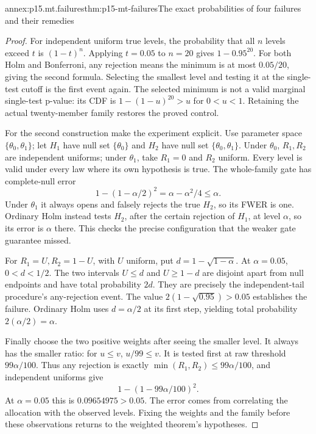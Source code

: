\begin{annexitem}{annex:p15.mt.failures}{thm:p15-mt-failures}{The exact probabilities of four failures and their remedies}
\begin{proof}
For independent uniform true levels, the probability that all \(n\)
levels exceed \(t\) is \((1-t)^n\). Applying \(t=0.05\) to \(n=20\)
gives \(1-0.95^{20}\). For both Holm and Bonferroni, any rejection
means the minimum is at most \(0.05/20\), giving the second formula.
Selecting the smallest level and testing it at the single-test cutoff
is the first event again. The selected minimum is not a valid marginal
single-test p-value: its CDF is \(1-(1-u)^{20}>u\) for \(0<u<1\).
Retaining the actual twenty-member family restores the proved control.

For the second construction make the experiment explicit.
Use parameter space \(\{\theta_0,\theta_1\}\);
let \(H_1\) have null set \(\{\theta_0\}\) and \(H_2\) have null
set \(\{\theta_0,\theta_1\}\). Under \(\theta_0\), \(R_1,R_2\)
are independent uniforms; under \(\theta_1\), take \(R_1=0\)
and \(R_2\) uniform. Every level is valid under every law where its
own hypothesis is true. The whole-family gate has complete-null error
\[
           1-(1-\alpha/2)^2=\alpha-\alpha^2/4\leq\alpha.
\]
Under \(\theta_1\) it always opens and falsely rejects the true \(H_2\),
so its FWER is one. Ordinary Holm instead tests \(H_2\), after the
certain rejection of \(H_1\), at level \(\alpha\), so its error is
\(\alpha\) there. This checks the precise configuration that the
weaker gate guarantee missed.

For \(R_1=U,R_2=1-U\), with \(U\) uniform, put
\(d=1-\sqrt{1-\alpha}\). At \(\alpha=0.05\), \(0<d<1/2\).
The two intervals \(U\leq d\) and \(U\geq1-d\) are disjoint apart
from null endpoints and have total probability \(2d\).
They are precisely the independent-tail procedure's any-rejection
event. The value \(2(1-\sqrt{0.95})>0.05\) establishes the failure.
Ordinary Holm uses \(d=\alpha/2\) at its first step, yielding total
probability \(2(\alpha/2)=\alpha\).

Finally choose the two positive weights after seeing the smaller level.
It always has the smaller ratio: for \(u\leq v\),
\(u/99\leq v\). It is tested first at raw threshold
\(99\alpha/100\). Thus any rejection is exactly
\(\min(R_1,R_2)\leq99\alpha/100\), and independent uniforms give
\[
 1-(1-99\alpha/100)^2.
\]
At \(\alpha=0.05\) this is \(0.09654975>0.05\).
The error comes from correlating the allocation with the observed
levels. Fixing the weights and the family before these observations
returns to the weighted theorem's hypotheses.
\end{proof}
\end{annexitem}

